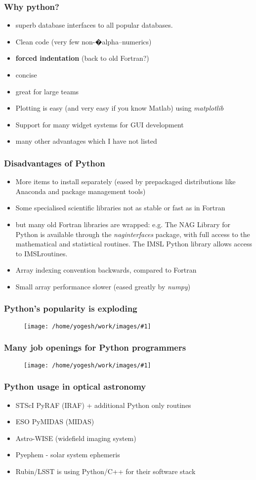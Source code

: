 \documentclass{beamer}
\newcommand{\bi}{\begin{itemize}}
\newcommand{\ei}{\end{itemize}}
\newcommand{\bfr}{\begin{frame}}
\newcommand{\ft}[1]{\frametitle{#1}}
\newcommand{\myfig}[1]{\begin{figure} \texttt{[image: /home/yogesh/work/images/\#1]} \end{figure}}
\begin{document}
\bfr
\ft{Why python?}
\bi
\item superb database interfaces to all popular databases.
\item Clean code (very few non-�alpha--numerics)
\item {\bf forced indentation} (back to old Fortran?)
\item concise
\item great for large teams
\item Plotting is easy (and very easy if you know Matlab) using {\it matplotlib}
\item Support for many widget systems for GUI development
\item many other advantages which I have not listed
\ei
\end{frame}

\bfr
\ft{Disadvantages of Python}
\bi
\item More items to install separately (eased by prepackaged distributions like Anaconda and package management tools)
\item Some specialised scientific libraries not as stable or fast as in Fortran
\item but many old Fortran libraries are wrapped: e.g. The NAG Library for Python is available through the {\it naginterfaces} package, with full access to the mathematical and statistical routines. The IMSL Python library allows access to IMSLroutines. 
\item Array indexing convention backwards, compared to Fortran
\item Small array performance slower (eased greatly by {\it numpy})
\ei
\end{frame}

\bfr
\ft{Python's popularity is exploding}
\myfig{python_popularity.png}
\end{frame}

\bfr
\ft{Many job openings for Python programmers}
\myfig{pythonnaukri2021.png}
\end{frame}

\bfr
\ft{Python usage in optical astronomy}
\bi
\item STScI PyRAF (IRAF) + additional Python only routines
\item ESO PyMIDAS (MIDAS)
\item Astro-WISE (widefield imaging system)
\item Pyephem - solar system ephemeris
\item Rubin/LSST is using Python/C++ for their software stack
\ei
\end{frame}
\end{document}
